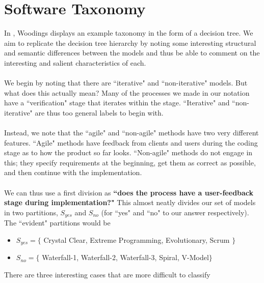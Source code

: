 \section{Software Taxonomy} \label{taxonomy}

In \cite{Woodings2013Tut1}, Woodings displays an example taxonomy in the form of
a decision tree.
We aim to replicate the decision tree hierarchy by noting some interesting
structural and semantic differences between the models and thus be able to
comment on the interesting and salient characteristics of each.\\
\\
We begin by noting that there are ``iterative" and ``non-iterative" models.
But what does this actually mean?
Many of the processes we made in our notation have a ``verification" stage that
iterates within the stage.
``Iterative" and ``non-iterative" are thus too general labels to begin with.\\
\\
Instead, we note that the ``agile" and ``non-agile" methods have two very
different features.
``Agile" methods have feedback from clients and users during the coding stage as
to how the product so far looks.
``Non-agile" methods do not engage in this; they specify requirements at the
beginning, get them as correct as possible, and then continue with the
implementation.\\
\\
We can thus use a first division as {\bf ``does the process have a user-feedback
stage during implementation?"}
This almost neatly divides our set of models in two partitions, $S_{yes}$ and
$S_{no}$ (for ``yes" and ``no" to our answer respectively).
The ``evident" partitions would be
\begin{itemize}
  \item $S_{yes} = \{$ Crystal Clear, Extreme Programming, Evolutionary, Scrum $\}$
  \item $S_{no} = \{$ Waterfall-1, Waterfall-2, Waterfall-3, Spiral, V-Model$\}$
\end{itemize}
There are three interesting cases that are more difficult to classify
